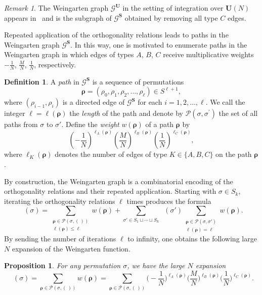 \documentclass[a4paper]{article}
\theoremstyle{plain}
\newtheorem{proposition}[theorem]{Proposition}
\numberwithin{theorem}{section}
\theoremstyle{definition}
\newtheorem{definition}[theorem]{Definition}
\theoremstyle{remark}
\newtheorem{remark}[theorem]{Remark}
\renewcommand{\leq}{\leqslant}
\newcommand{\UM}{\mathbf{U}}			%
\newcommand{\SM}{\mathbf{S}}			%
\DeclareMathOperator{\SW}{Wg^{\SM}}		%
\newcommand{\SG}{S} 					%
\begin{document}
\begin{remark}
The Weingarten graph $\mathcal{G}^\UM$ in the setting of integration over $\UM(N)$ appears in~\cite{col-mat17} and is the subgraph of $\mathcal{G}^\SM$ obtained by removing all type $C$ edges.
\end{remark}


Repeated application of the orthogonality relations leads to paths in the Weingarten graph $\mathcal{G}^\SM$. In this way, one is motivated to enumerate paths in the Weingarten graph in which edges of types $A$, $B$, $C$ receive multiplicative weights $-\frac{1}{N}$, $\frac{M}{N}$, $\frac{1}{N}$, respectively.


\begin{definition}
A {\em path} in $\mathcal{G}^\SM$ is a sequence of permutations 
\[
\bm{\rho} = (\rho_0, \rho_1, \rho_2, \ldots, \rho_\ell) \in \SG^{\ell+1},
\]
where $(\rho_{i-1}, \rho_{i})$ is a directed edge of $\mathcal{G}^\SM$ for each $i = 1, 2, \ldots, \ell$. We call the integer $\ell = \ell(\bm{\rho})$ the {\em length} of the path and denote by $\mathcal{P}(\sigma, \sigma^\prime)$ the set of all paths from $\sigma$ to $\sigma'$. Define the {\em weight} $w(\bm{\rho})$ of a path $\bm{\rho}$ by 
\[
\left( -\frac{1}{N} \right)^{\ell_A(\bm{\rho})} \left( \frac{M}{N} \right)^{\ell_B(\bm{\rho})} \left( \frac{1}{N} \right)^{\ell_C(\bm{\rho})},
\]
where $\ell_K(\bm{\rho})$ denotes the number of edges of type $K\in \{A,B,C\}$ on the path $\bm{\rho}$.
\end{definition}


By construction, the Weingarten graph is a combinatorial encoding of the orthogonality relations and their repeated application. Starting with $\sigma \in \SG_k$, iterating the orthogonality relations $\ell$ times produces the formula
\[
\SW(\sigma) = \sum_{\substack{\bm{\rho} \in \mathcal{P}(\sigma,(\,)) \\ \ell(\bm{\rho}) \leq \ell }} w(\bm{\rho}) + \sum_{\sigma' \in \SG_1 \sqcup \cdots \sqcup \SG_k} \SW(\sigma') \sum_{\substack{\bm{\rho} \in \mathcal{P}(\sigma, \sigma') \\ \ell(\bm{\rho}) = \ell}} w(\bm{\rho}).
\]
By sending the number of iterations $\ell$ to infinity, one obtains the following large $N$ expansion of the Weingarten function.


\begin{proposition}
For any permutation $\sigma$, we have the large $N$ expansion 
\[
\SW(\sigma) = \sum_{\bm{\rho} \in \mathcal{P}(\sigma,(\,))} w(\bm{\rho}) = \sum_{\bm{\rho} \in \mathcal{P}(\sigma,(\,))} \bigg( -\frac{1}{N} \bigg)^{\ell_A(\bm{\rho})} \bigg( \frac{M}{N} \bigg)^{\ell_B(\bm{\rho})} \bigg( \frac{1}{N} \bigg)^{\ell_C(\bm{\rho})}.
\]
\end{proposition}
\end{document}
